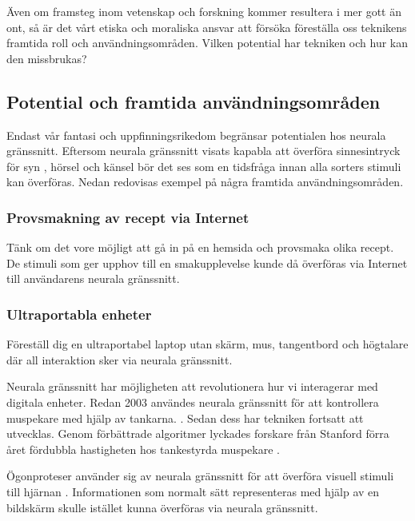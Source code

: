 \documentclass[12pt, a4paper]{article}
\begin{document}
Även om framsteg inom vetenskap och forskning kommer resultera i mer gott än
ont, så är det vårt etiska och moraliska ansvar att försöka föreställa oss
teknikens framtida roll och användningsområden. Vilken potential har tekniken
och hur kan den missbrukas?


\subsection{Potential och framtida användningsområden}

Endast vår fantasi och uppfinningsrikedom begränsar potentialen hos neurala
gränssnitt. Eftersom neurala gränssnitt visats kapabla att överföra
sinnesintryck för syn \cite{sight1,sight2}, hörsel \cite{sound} och känsel
\cite{touch} bör det ses som en tidsfråga innan alla sorters stimuli kan
överföras. Nedan redovisas exempel på några framtida användningsområden.

\subsubsection{Provsmakning av recept via Internet}

Tänk om det vore möjligt att gå in på en hemsida och provsmaka olika recept. De
stimuli som ger upphov till en smakupplevelse kunde då överföras via Internet
till användarens neurala gränssnitt.

\subsubsection{Ultraportabla enheter}

Föreställ dig en ultraportabel laptop utan skärm, mus, tangentbord och högtalare
där all interaktion sker via neurala gränssnitt.

Neurala gränssnitt har möjligheten att revolutionera hur vi interagerar med
digitala enheter. Redan 2003 användes neurala gränssnitt för att kontrollera
muspekare med hjälp av tankarna. \cite{cursor1}. Sedan dess har tekniken
fortsatt att utvecklas. Genom förbättrade algoritmer lyckades forskare från
Stanford förra året fördubbla hastigheten hos tankestyrda muspekare
\cite{fast_cursor}.

Ögonproteser använder sig av neurala gränssnitt för att överföra visuell stimuli
till hjärnan \cite{prosthetic_operation}. Informationen som normalt sätt
representeras med hjälp av en bildskärm skulle istället kunna överföras via
neurala gränssnitt.
\end{document}

